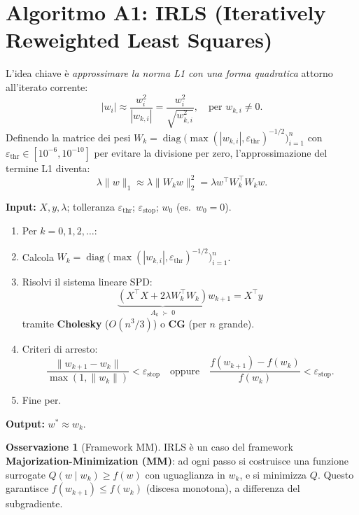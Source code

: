\documentclass[11pt, a4paper, twoside]{book}
\theoremstyle{definition}
\newtheorem{remark}{Osservazione}[chapter]
\theoremstyle{plain}
\theoremstyle{remark}
\DeclareMathOperator{\diag}{diag}
\begin{document}
\section{Algoritmo A1: IRLS (Iteratively Reweighted Least Squares)}
\label{sec:irls}

L'idea chiave è \emph{approssimare la norma L1 con una forma quadratica} attorno all'iterato corrente:
\[
  |w_i| \approx \frac{w_i^2}{|w_{k,i}|} = \frac{w_i^2}{\sqrt{w_{k,i}^2}},
  \quad \text{per } w_{k,i} \neq 0.
\]
Definendo la matrice dei pesi $W_k = \diag\bigl(\max(|w_{k,i}|, \varepsilon_{\mathrm{thr}})^{-1/2}\bigr)_{i=1}^n$
con $\varepsilon_{\mathrm{thr}} \in [10^{-6}, 10^{-10}]$ per evitare la divisione per zero,
l'approssimazione del termine L1 diventa:
\[
  \lambda\|w\|_1 \approx \lambda \|W_k w\|^2_2 = \lambda w^\top W_k^\top W_k w.
\]

\begin{algobox}
\textbf{Input:} $X, y, \lambda$; tolleranza $\varepsilon_{\mathrm{thr}}$; $\varepsilon_{\mathrm{stop}}$; $w_0$ (es.\ $w_0 = 0$).
\begin{enumerate}
  \item Per $k = 0, 1, 2, \ldots$:
  \item \quad Calcola $W_k = \diag\bigl(\max(|w_{k,i}|, \varepsilon_{\mathrm{thr}})^{-1/2}\bigr)_{i=1}^n$.
  \item \quad Risolvi il sistema lineare SPD:
        \[
          \underbrace{(X^\top X + 2\lambda W_k^\top W_k)}_{A_k\;\succ\;0} w_{k+1} = X^\top y
        \]
        tramite \textbf{Cholesky} ($O(n^3/3)$) o \textbf{CG} (per $n$ grande).
  \item \quad Criteri di arresto:
        \[
          \frac{\|w_{k+1} - w_k\|}{\max(1, \|w_k\|)} < \varepsilon_{\mathrm{stop}}
          \quad\text{oppure}\quad \frac{f(w_{k+1}) - f(w_k)}{f(w_k)} < \varepsilon_{\mathrm{stop}}.
        \]
  \item Fine per.
\end{enumerate}
\textbf{Output:} $w^* \approx w_k$.
\end{algobox}

\begin{remark}[Framework MM]
IRLS è un caso del framework \textbf{Majorization-Minimization (MM)}: ad ogni passo si costruisce
una funzione surrogate $Q(w \mid w_k) \geq f(w)$ con uguaglianza in $w_k$, e si minimizza $Q$.
Questo garantisce $f(w_{k+1}) \leq f(w_k)$ (discesa monotona), a differenza del subgradiente.
\end{remark}
\end{document}
